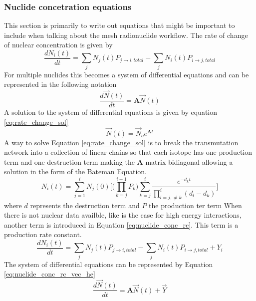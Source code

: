 \subsubsection{Nuclide concetration equations}
This section is primarily to write out equations that might be
important to include when talking about the mesh radionuclide
workflow.
The rate of change of nuclear concentration is given by
\begin{equation}\label{eq:nuclide_conc_rc}
    \frac{dN_{i}(t)}{dt} = \sum_{j} N_{j}(t)P_{j \rightarrow i, total}
    - \sum_{j} N_{i}(t)P_{i \rightarrow j, total}
\end{equation}
For multiple nuclides this becomes a system of differential equations and
can be represented in the following notation
\begin{equation}\label{eq:nuclide_conc_rc_vec}
  \frac{d\vec{N}(t)}{dt} =\boldsymbol{A}  \vec{N}(t)
\end{equation}
A solution to the system of differential equations is given by equation \ref{eq:rate_change_sol}
\begin{equation}\label{eq:rate_change_sol}
  \vec{N}(t) =\vec{N}_{o} e^{\boldsymbol{A}t}
\end{equation}
A way to solve Equation \ref{eq:rate_change_sol} is to break the transmutation network
into a collection of linear chains so that each isotope has one production term and
one destruction term making the $\boldsymbol{A}$ matrix bidiagonal allowing a solution
in the form of the Bateman Equation.
\begin{equation}\label{eq:bateman}
  N_{i}(t) = \sum_{j=1}^{i} N_{j}(0)
  \Bigg[ \Bigg( \prod_{k=j}^{i-1} P_{k} \Bigg)
  \sum_{k=j}^{i}\frac{e^{-d_{k}t}}{\displaystyle \prod_{l=j,\neq k}^{i}(d_{l} -d_{k})}
  \Bigg]
\end{equation}
where $d$ represents the destruction term and $P$ the production ter term
When there is not nuclear data availble, like is the case for high energy interactions,
another term is introduced in Equation \ref{eq:nuclide_conc_rc}. This term is a
production rate constant.
\begin{equation}\label{eq:nuclide_conc_rc_he}
    \frac{dN_{i}(t)}{dt} = \sum_{j} N_{j}(t)P_{j \rightarrow i, total}
    - \sum_{j} N_{i}(t)P_{i \rightarrow j, total} + Y_{i}
\end{equation}
The system of differential equations can be represented by
Equation \ref{eq:nuclide_conc_rc_vec_he}
\begin{equation}\label{eq:nuclide_conc_rc_vec_he}
  \frac{d\vec{N}(t)}{dt} =\boldsymbol{A}  \vec{N}(t) + \vec{Y}
\end{equation}
